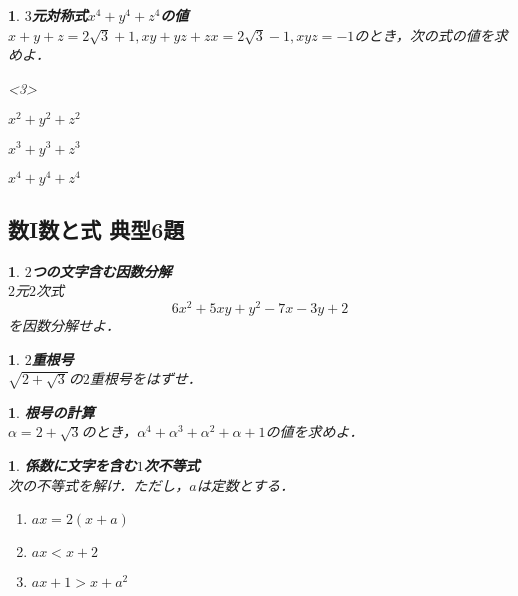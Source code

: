 \documentclass[10pt,
fleqn,
dvipdfmx,
uplatex
]{jsarticle}
\newtheorem{question}[Question]{}
\begin{document}
\begin{question}{\bf\boldmath $3$元対称式$x^4+y^4+z^4$の値}\\
$x+y+z=2\sqrt 3+1, xy+yz+zx=2\sqrt 3-1, xyz=-1$のとき，次の式の値を求めよ．
\begin{edaenumerate}<3>
\item $x^2+y^2+z^2$
\item $x^3+y^3+z^3$
\item $x^4+y^4+z^4$
\end{edaenumerate}

\end{question}

\subsection{数I数と式 典型6題}



\begin{question}{\bf\boldmath $2$つの文字含む因数分解}\\
$2$元$2$次式
\[6x^2+5xy+y^2-7x-3y+2\]
を因数分解せよ．
\end{question}



\begin{question}{\bf\boldmath $2$重根号}\\
$\sqrt {2+\sqrt 3}$の$2$重根号をはずせ．
\end{question}



\begin{question}{\bf\boldmath 根号の計算}\\
$\alpha =2+\sqrt 3$のとき，$\alpha ^4+\alpha ^3+\alpha ^2+\alpha +1$の値を求めよ．
\end{question}



\begin{question}{\bf\boldmath 係数に文字を含む$1$次不等式}\\
次の不等式を解け．ただし，$a$は定数とする．
\begin{enumerate}
\item $ax=2\left(x+a\right)$
\item $ax<x+2$
\item $ax+1>x+a^2$
\end{enumerate}

\end{question}
\end{document}
